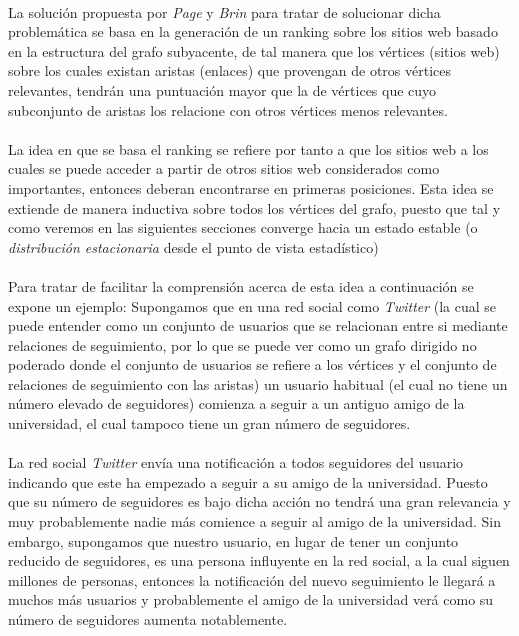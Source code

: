 \documentclass{subfiles}
\begin{document}
      \paragraph{}
      La solución propuesta por \emph{Page} y \emph{Brin} para tratar de solucionar dicha problemática se basa en la generación de un ranking sobre los sitios web basado en la estructura del grafo subyacente, de tal manera que los vértices (sitios web) sobre los cuales existan aristas (enlaces) que provengan de otros vértices relevantes, tendrán una puntuación mayor que la de vértices que cuyo subconjunto de aristas los relacione con otros vértices menos relevantes.

      \paragraph{}
      La idea en que se basa el ranking se refiere por tanto a que los sitios web a los cuales se puede acceder a partir de otros sitios web considerados como importantes, entonces deberan encontrarse en primeras posiciones. Esta idea se extiende de manera inductiva sobre todos los vértices del grafo, puesto que tal y como veremos en las siguientes secciones converge hacia un estado estable (o \emph{distribución estacionaria} desde el punto de vista estadístico)

      \paragraph{}
      Para tratar de facilitar la comprensión acerca de esta idea a continuación se expone un ejemplo: Supongamos que en una red social como \emph{Twitter} (la cual se puede entender como un conjunto de usuarios que se relacionan entre si mediante relaciones de seguimiento, por lo que se puede ver como un grafo dirigido no poderado donde el conjunto de usuarios se refiere a los vértices y el conjunto de relaciones de seguimiento con las aristas) un usuario habitual (el cual no tiene un número elevado de seguidores) comienza a seguir a un antiguo amigo de la universidad, el cual tampoco tiene un gran número de seguidores.

      \paragraph{}
      La red social \emph{Twitter} envía una notificación a todos seguidores del usuario indicando que este ha empezado a seguir a su amigo de la universidad. Puesto que su número de seguidores es bajo dicha acción no tendrá una gran relevancia y muy probablemente nadie más comience a seguir al amigo de la universidad. Sin embargo, supongamos que nuestro usuario, en lugar de tener un conjunto reducido de seguidores, es una persona influyente en la red social, a la cual siguen millones de personas, entonces la notificación del nuevo seguimiento le llegará a muchos más usuarios y probablemente el amigo de la universidad verá como su número de seguidores aumenta notablemente.
\end{document}
